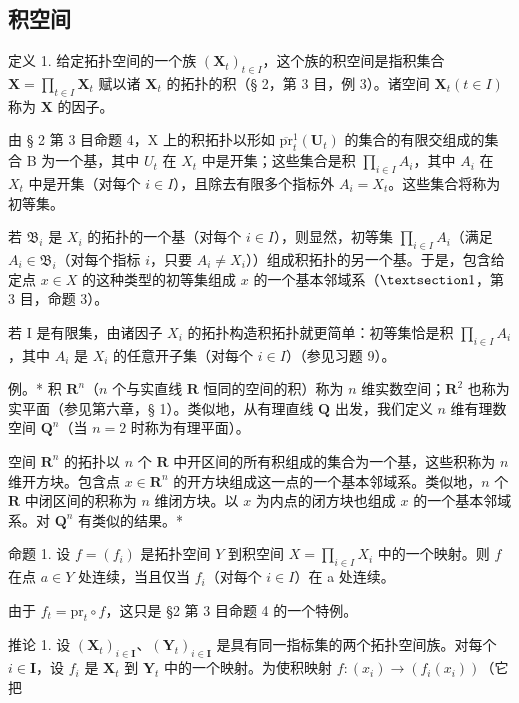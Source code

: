 \subsection{积空间}

定义 1. 给定拓扑空间的一个族 \((\mathbf{X}_{t})_{t\in I}\)，这个族的积空间是指积集合 \(\mathbf{X} = \prod_{t\in I}\mathbf{X}_{t}\) 赋以诸 \(\mathbf{X}_{t}\) 的拓扑的积（§ 2，第 3 目，例 3）。诸空间 \(\mathbf{X}_{t}(t\in I)\) 称为 \(\mathbf{X}\) 的因子。

由 § 2 第 3 目命题 4，X 上的积拓扑以形如 \(\overline{\mathrm{pr}}_{t}^{1}(\mathbf{U}_{t})\) 的集合的有限交组成的集合 B 为一个基，其中 \(U_{t}\) 在 \(X_{t}\) 中是开集；这些集合是积 \(\prod_{i\in I}A_{i}\)，其中 \(A_{i}\) 在 \(X_{t}\) 中是开集（对每个 \(i\in I\)），且除去有限多个指标外 \(A_{i}=X_{t}\)。这些集合将称为初等集。

若 \(\mathfrak{B}_i\) 是 \(X_i\) 的拓扑的一个基（对每个 \(i \in I\)），则显然，初等集 \(\prod_{i \in I} A_i\)（满足 \(A_i \in \mathfrak{B}_i\)（对每个指标 \(i\)，只要 \(A_i \neq X_i\)））组成积拓扑的另一个基。于是，包含给定点 \(x \in X\) 的这种类型的初等集组成 \(x\) 的一个基本邻域系（\(\S 1\)，第 3 目，命题 3）。

若 I 是有限集，由诸因子 \(X_{i}\) 的拓扑构造积拓扑就更简单：初等集恰是积 \(\prod_{i\in I}A_{i}\)，其中 \(A_{i}\) 是 \(X_{i}\) 的任意开子集（对每个 \(i\in I\)）（参见习题 9）。

例。* 积 \(\mathbf{R}^n\)（\(n\) 个与实直线 \(\mathbf{R}\) 恒同的空间的积）称为 \(n\) 维实数空间；\(\mathbf{R}^2\) 也称为实平面（参见第六章，§ 1）。类似地，从有理直线 \(\mathbf{Q}\) 出发，我们定义 \(n\) 维有理数空间 \(\mathbf{Q}^n\)（当 \(n = 2\) 时称为有理平面）。

空间 \(\mathbf{R}^n\) 的拓扑以 \(n\) 个 \(\mathbf{R}\) 中开区间的所有积组成的集合为一个基，这些积称为 \(n\) 维开方块。包含点 \(x \in \mathbf{R}^n\) 的开方块组成这一点的一个基本邻域系。类似地，\(n\) 个 \(\mathbf{R}\) 中闭区间的积称为 \(n\) 维闭方块。以 \(x\) 为内点的闭方块也组成 \(x\) 的一个基本邻域系。对 \(\mathbf{Q}^n\) 有类似的结果。*

命题 1. 设 \(f = (f_{i})\) 是拓扑空间 \(Y\) 到积空间 \(X = \prod_{i \in I} X_{i}\) 中的一个映射。则 \(f\) 在点 \(a \in Y\) 处连续，当且仅当 \(f_{i}\)（对每个 \(i \in I\)）在 a 处连续。

由于 \(f_{t} = \mathrm{pr}_{t} \circ f\)，这只是 §2 第 3 目命题 4 的一个特例。

推论 1. 设 \((\mathbf{X}_t)_{i \in \mathbf{I}}\)、\((\mathbf{Y}_t)_{i \in \mathbf{I}}\) 是具有同一指标集的两个拓扑空间族。对每个 \(i \in \mathbf{I}\)，设 \(f_i\) 是 \(\mathbf{X}_t\) 到 \(\mathbf{Y}_t\) 中的一个映射。为使积映射 \(f: (x_i) \to (f_i(x_i))\)（它把

